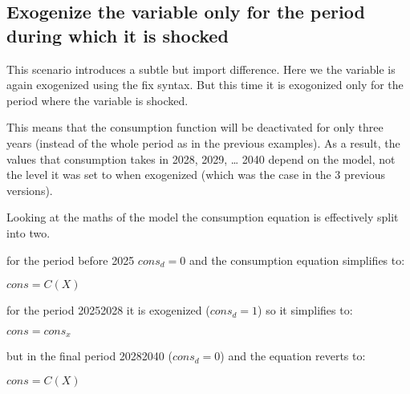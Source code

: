 \documentclass[letterpaper,10pt,english]{jupyterBook}
\begin{document}
\subsection{Exogenize the variable only for the period during which it is shocked}
\label{\detokenize{content/06_WBModels/ScenarioAnalysis:exogenize-the-variable-only-for-the-period-during-which-it-is-shocked}}
\sphinxAtStartPar
This scenario introduces a subtle but import difference.  Here we the variable is again exogenized using the fix syntax. But this time it is exogonized only for the period where the variable is shocked.

\sphinxAtStartPar
This means that the consumption function will be de\sphinxhyphen{}activated for only three years (instead of the whole period as in the previous examples).  As a result, the values that consumption takes in 2028, 2029, … 2040 depend on the model, not the level it was set to when exogenized (which was the case in the 3 previous versions).

\sphinxAtStartPar
Looking at the maths of the model the consumption equation is effectively split into two.

\sphinxAtStartPar
for the period before 2025 \(cons_d=0\) and the consumption equation simplifies to:

\sphinxAtStartPar
\(cons=C(X)\)

\sphinxAtStartPar
for the period 2025\sphinxhyphen{}2028 it is exogenized (\(cons_d=1\)) so it simplifies to:

\sphinxAtStartPar
\(cons=cons_x\)

\sphinxAtStartPar
but in the final period 2028\sphinxhyphen{}2040 (\(cons_d=0\)) and the equation reverts to:

\sphinxAtStartPar
\(cons=C(X)\)
\end{document}
